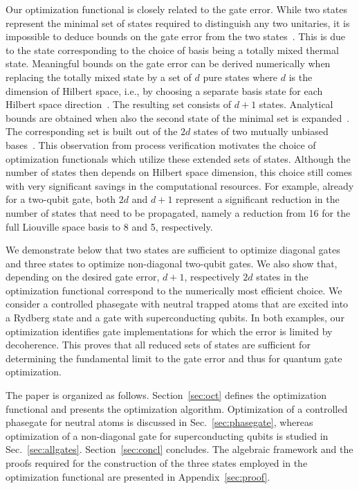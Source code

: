 Our optimization functional is closely related to the gate error. 
While two states represent the minimal set of states required to
distinguish any two unitaries, it is impossible to deduce bounds on
the gate error from the two
states~\cite{ReichKochPRA13}. This is due to the state corresponding to
the choice of basis being a totally mixed thermal state. Meaningful
bounds on the gate error can be derived numerically when replacing the totally
mixed state by a set of $d$ pure states where $d$ is the dimension of
Hilbert space, i.e., by choosing a separate basis state for each
Hilbert space direction~\cite{ReichKochPRA13,FiurasekPRA14}. The resulting set
consists of $d+1$ states. Analytical bounds are obtained when also the
second state of the minimal set is expanded~\cite{HofmannPRL05}. The
corresponding set is built out of the $2d$ states of two mutually
unbiased bases~\cite{ReichKochPRA13}. This observation from process
verification motivates the choice of optimization functionals which
utilize these extended sets of states. Although the
number of states then depends on Hilbert space dimension, this choice still
comes with very significant savings in the computational resources.
For example, already for a two-qubit gate,
both $2d$ and $d+1$ represent a significant reduction in the number of
states that need to be propagated, namely a reduction from 16 for the
full Liouville space basis to 8 and 5, respectively. 

We demonstrate below that two states are sufficient to
optimize diagonal gates and three states to optimize non-diagonal
two-qubit gates. We also show that, depending on the desired gate
error, $d+1$, respectively $2d$ states in the optimization functional
correspond to the numerically most efficient choice. We consider a
controlled phasegate  with neutral trapped atoms that are excited into 
a Rydberg state and a \sqrtISWAP gate with
superconducting qubits. In both examples, our optimization identifies
gate implementations for which the error is limited by
decoherence. This proves that all reduced sets of states are
sufficient for determining the fundamental limit to the gate error and
thus for quantum gate optimization. 

The paper is organized as follows. Section~\ref{sec:oct} defines 
the optimization functional and presents the optimization
algorithm. Optimization of a controlled phasegate for neutral atoms is
discussed in Sec.~\ref{sec:phasegate}, whereas optimization of a
non-diagonal gate for superconducting qubits is studied in
Sec.~\ref{sec:allgates}. Section~\ref{sec:concl}
concludes. 
The algebraic framework and the proofs required for the construction
of the three states employed in the optimization functional are
presented in Appendix~\ref{sec:proof}. 


